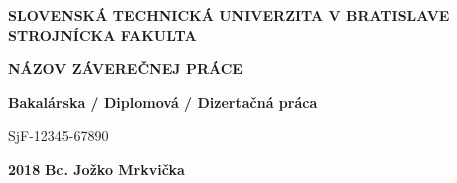 \renewcommand\thepage{\roman{page}}
\thispagestyle{empty}

\noindent \begin{center}
\textbf{{\large{}SLOVENSKÁ TECHNICKÁ UNIVERZITA V BRATISLAVE}}\\
\textbf{{\large{}STROJNÍCKA FAKULTA}}\textbf{\large{} }\\
\vspace{3cm}
\par\end{center}

\noindent \begin{center}
\vspace{3cm}
\par\end{center}



\begin{center}
\textbf{\textsc{\Large{}NÁZOV ZÁVEREČNEJ PRÁCE}}\\
\par\end{center}{\Large \par}

\begin{center}
\textbf{\large{}Bakalárska / Diplomová / Dizertačná práca}\\
\par\end{center}{\large \par}

\begin{center}
{\large{}SjF-12345-67890}\\
\par\end{center}{\large \par}



\vfill
\noindent \textbf{\large{}2018} \hfill \textbf{\large{}Bc. Jožko Mrkvička}
\cleardoublepage
